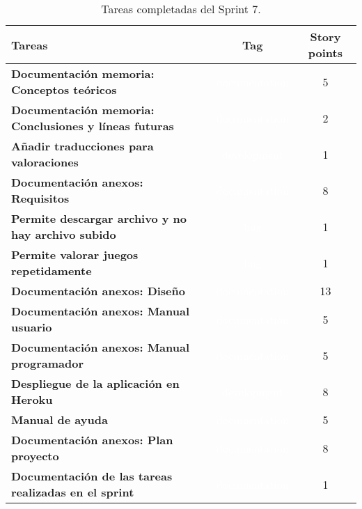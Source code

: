 \begin{table}[ht!]
    \centering
    \resizebox{15cm}{!} {
    \begin{tabular}{|l|c|c|}
    \hline
    \rowcolor[rgb]{0.99,0.93,0.93}
    \textbf{Tareas}     &\textbf{Tag}     & \textbf{Story points} \\ \hline
    \textbf{Documentación memoria: Conceptos teóricos }          &\cellcolor[rgb]{0.0,0.33,0.71}\textcolor{white}{documentation}      &5 \\ \hline 
    \textbf{Documentación memoria: Conclusiones y líneas futuras}         &\cellcolor[rgb]{0.0,0.33,0.71}\textcolor{white}{documentation}      &2 \\ \hline
     \textbf{Añadir traducciones para valoraciones}         &\cellcolor[rgb]{0.99,0.83,0.93}\textcolor{white}{development}      &1 \\ \hline 
    \textbf{Documentación anexos: Requisitos}         &\cellcolor[rgb]{0.0,0.33,0.71}\textcolor{white}{documentation}      &8 \\ \hline 
    \textbf{Permite descargar archivo y no hay archivo subido}         &\cellcolor[rgb]{0.8, 0.36, 0.36}\textcolor{white}{bug}      &1 \\ \hline 
    \textbf{Permite valorar juegos repetidamente}         &\cellcolor[rgb]{0.8, 0.36, 0.36}\textcolor{white}{bug}      &1 \\ \hline 
    \textbf{Documentación anexos: Diseño}         &\cellcolor[rgb]{0.0,0.33,0.71}\textcolor{white}{documentation}      &13 \\ \hline 
    \textbf{Documentación anexos: Manual usuario}         &\cellcolor[rgb]{0.0,0.33,0.71}\textcolor{white}{documentation}      &5 \\ \hline 
    \textbf{Documentación anexos: Manual programador}         &\cellcolor[rgb]{0.0,0.33,0.71}\textcolor{white}{documentation}      &5 \\ \hline 
    \textbf{Despliegue de la aplicación en Heroku}         &\cellcolor[rgb]{0.99,0.83,0.93}\textcolor{white}{development}      &8 \\ \hline 
    \textbf{Manual de ayuda}         &\cellcolor[rgb]{0.0,0.33,0.71}\textcolor{white}{documentation}      &5 \\ \hline 
    \textbf{Documentación anexos: Plan proyecto}         &\cellcolor[rgb]{0.0,0.33,0.71}\textcolor{white}{documentation}      &8 \\ \hline 
    \textbf{Documentación de las tareas realizadas en el sprint}         &\cellcolor[rgb]{0.0,0.33,0.71}\textcolor{white}{documentation}      &1 \\ \hline 
    \end{tabular}}
    \caption{Tareas completadas del Sprint 7.}
    \label{tab:my_label}
\end{table}

